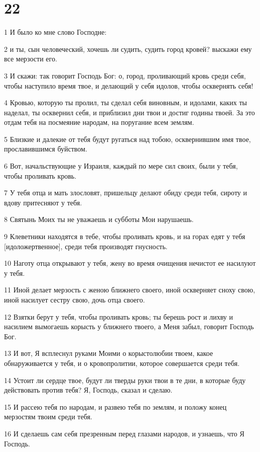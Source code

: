 \chapter{22}

\par 1 И было ко мне слово Господне:
\par 2 и ты, сын человеческий, хочешь ли судить, судить город кровей? выскажи ему все мерзости его.
\par 3 И скажи: так говорит Господь Бог: о, город, проливающий кровь среди себя, чтобы наступило время твое, и делающий у себя идолов, чтобы осквернять себя!
\par 4 Кровью, которую ты пролил, ты сделал себя виновным, и идолами, каких ты наделал, ты осквернил себя, и приблизил дни твои и достиг годины твоей. За это отдам тебя на посмеяние народам, на поругание всем землям.
\par 5 Близкие и далекие от тебя будут ругаться над тобою, осквернившим имя твое, прославившимся буйством.
\par 6 Вот, начальствующие у Израиля, каждый по мере сил своих, были у тебя, чтобы проливать кровь.
\par 7 У тебя отца и мать злословят, пришельцу делают обиду среди тебя, сироту и вдову притесняют у тебя.
\par 8 Святынь Моих ты не уважаешь и субботы Мои нарушаешь.
\par 9 Клеветники находятся в тебе, чтобы проливать кровь, и на горах едят у тебя [идоложертвенное], среди тебя производят гнусность.
\par 10 Наготу отца открывают у тебя, жену во время очищения нечистот ее насилуют у тебя.
\par 11 Иной делает мерзость с женою ближнего своего, иной оскверняет сноху свою, иной насилует сестру свою, дочь отца своего.
\par 12 Взятки берут у тебя, чтобы проливать кровь; ты берешь рост и лихву и насилием вымогаешь корысть у ближнего твоего, а Меня забыл, говорит Господь Бог.
\par 13 И вот, Я всплеснул руками Моими о корыстолюбии твоем, какое обнаруживается у тебя, и о кровопролитии, которое совершается среди тебя.
\par 14 Устоит ли сердце твое, будут ли тверды руки твои в те дни, в которые буду действовать против тебя? Я, Господь, сказал и сделаю.
\par 15 И рассею тебя по народам, и развею тебя по землям, и положу конец мерзостям твоим среди тебя.
\par 16 И сделаешь сам себя презренным перед глазами народов, и узнаешь, что Я Господь.
